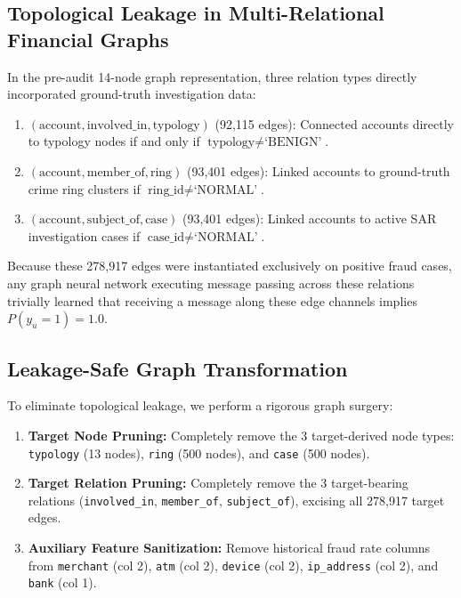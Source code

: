 \documentclass[conference]{IEEEtran}
\begin{document}
\subsection{Topological Leakage in Multi-Relational Financial Graphs}
In the pre-audit 14-node graph representation, three relation types directly incorporated ground-truth investigation data:
\begin{enumerate}
    \item $(\text{account}, \text{involved\_in}, \text{typology})$ (92,115 edges): Connected accounts directly to typology nodes if and only if $\text{typology} \neq \text{`BENIGN'}$.
    \item $(\text{account}, \text{member\_of}, \text{ring})$ (93,401 edges): Linked accounts to ground-truth crime ring clusters if $\text{ring\_id} \neq \text{`NORMAL'}$.
    \item $(\text{account}, \text{subject\_of}, \text{case})$ (93,401 edges): Linked accounts to active SAR investigation cases if $\text{case\_id} \neq \text{`NORMAL'}$.
\end{enumerate}

Because these 278,917 edges were instantiated exclusively on positive fraud cases, any graph neural network executing message passing across these relations trivially learned that receiving a message along these edge channels implies $P(y_u = 1) = 1.0$.

\subsection{Leakage-Safe Graph Transformation}
To eliminate topological leakage, we perform a rigorous graph surgery:
\begin{enumerate}
    \item \textbf{Target Node Pruning:} Completely remove the 3 target-derived node types: \texttt{typology} (13 nodes), \texttt{ring} (500 nodes), and \texttt{case} (500 nodes).
    \item \textbf{Target Relation Pruning:} Completely remove the 3 target-bearing relations (\texttt{involved\_in}, \texttt{member\_of}, \texttt{subject\_of}), excising all 278,917 target edges.
    \item \textbf{Auxiliary Feature Sanitization:} Remove historical fraud rate columns from \texttt{merchant} (col 2), \texttt{atm} (col 2), \texttt{device} (col 2), \texttt{ip\_address} (col 2), and \texttt{bank} (col 1).
\end{enumerate}
\end{document}
